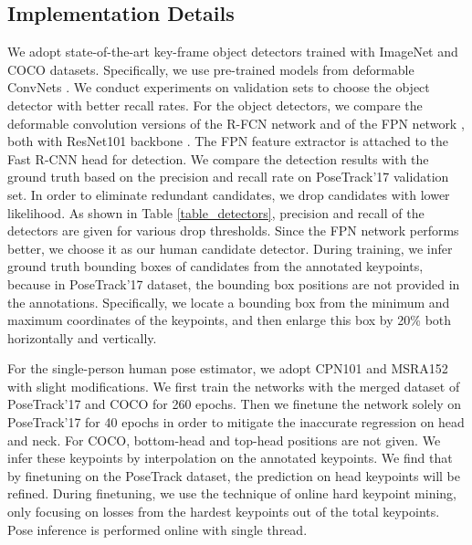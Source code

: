 \documentclass[10pt,twocolumn,letterpaper]{article}
\begin{document}
	\subsection{Implementation  Details}
	\label{sec:details}
	We adopt state-of-the-art key-frame object detectors trained with ImageNet and COCO datasets. Specifically, we use pre-trained models from deformable ConvNets \cite{dai17dcn}. 
	We conduct experiments on validation sets to choose the object detector with better recall rates.
	For the object detectors, we compare the deformable convolution versions of the R-FCN network \cite{dai2016r} and of the FPN network \cite{lin2017feature}, both with ResNet101 backbone \cite{he2016deep}.
	The FPN feature extractor is attached to the Fast R-CNN \cite{girshick2015fast} head for detection.
	We compare the detection results with the ground truth based on the precision and recall rate on PoseTrack'17 validation set.  
	In order to eliminate redundant candidates, we drop candidates with lower {likelihood}. 
	As shown in Table \ref{table_detectors}, precision and recall of the detectors are given for various drop thresholds. Since the FPN network performs better, we choose it as our human candidate detector. 
	During training, we infer ground truth bounding boxes of candidates from the annotated keypoints, because in PoseTrack'17 dataset, the bounding box positions are not provided in the annotations. Specifically, we locate a bounding box from the minimum and maximum coordinates of the  keypoints, and then enlarge this box by 20\% both horizontally and vertically. 

	For the single-person human pose estimator, we adopt CPN101 \cite{chen2017cascaded} and MSRA152 \cite{xiao2018simple} with slight modifications. 
	We first train the networks with the merged dataset of PoseTrack'17 and COCO for 260 epochs. Then we finetune the network solely on PoseTrack'17 for 40 epochs in order to mitigate the inaccurate regression on head and neck. For COCO, bottom-head and top-head positions are not given. We infer these keypoints by interpolation on the annotated keypoints. We find that by finetuning on the PoseTrack dataset, the prediction on head keypoints will be refined. During finetuning, we use the technique of online hard keypoint mining, only focusing on losses from the  hardest keypoints out of the total  keypoints. 
	Pose inference is performed online with single thread.
	
\end{document}
